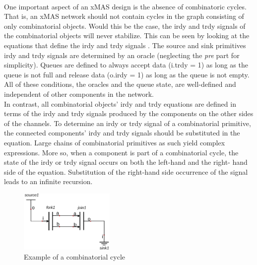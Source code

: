 \documentclass[a4paper,11pt]{article}
\begin{document}
\paragraph{}
One important aspect of an xMAS design is the absence of combinatoric cycles. That is, an xMAS
network should not contain cycles in the graph consisting of only combinatorial objects.
Would this be the case, the irdy and trdy signals of the combinatorial objects will never
stabilize. This can be seen by looking at the equations that define the irdy and trdy signals
\cite{chatterjee10}. The source and sink primitives irdy and trdy signals are determined by an
oracle (neglecting the \emph{pre} part for simplicity). Queues are defined to always accept
data (i.trdy = 1) as long as the queue is not full and release data (o.irdy = 1) as long as
the queue is not empty. All of these conditions, the oracles and the queue state, are well-defined
and independent of other components in the network.\\
In contrast, all combinatorial objects' irdy and trdy equations are defined in terms of the
irdy and trdy signals produced by the components on the other sides of the channels.
To determine an irdy or trdy signal of a combinatorial primitive, the connected components'
irdy and trdy signals should be substituted in the equation. Large chains of combinatorial
primitives as such yield complex expressions. More so, when a component is part of a
combinatorial cycle, the state of the irdy or trdy signal occurs on both the left-hand and the right-
hand side of the equation. Substitution of the right-hand side occurrence of the signal leads
to an infinite recursion.

\begin{figure}[hp]
 \includegraphics[height=3cm]{images/fork-join-cycle}
 \caption{Example of a combinatorial cycle}
 \label{fig:fork-join-cycle}
\end{figure}
\end{document}
